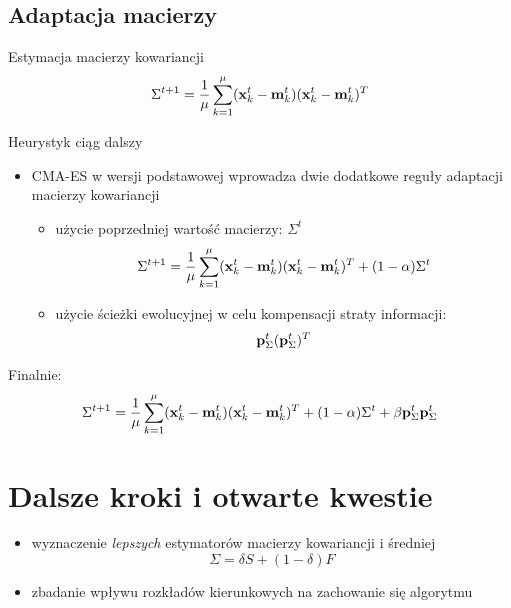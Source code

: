 \documentclass[slidescentered]{beamer}
\newcommand{\wek}[1]{
	{\bf #1} 
}
\begin{document}
\subsection{Adaptacja macierzy}

\begin{frame}{Estymacja macierzy kowariancji}
	\begin{equation}
		\Sigma^{t+1} = \frac{1}{\mu}\sum^{\mu}_{k = 1}(\wek{x}^{t}_{k} - \wek{m}^{t}_{k})(\wek{x}^{t}_{k} - \wek{m}^{t}_{k})^{T}
	\end{equation}
\end{frame}

\begin{frame}{Heurystyk ciąg dalszy}
	\begin{itemize}
	 	\item CMA-ES w wersji podstawowej wprowadza dwie dodatkowe reguły adaptacji macierzy kowariancji
			\begin{itemize}
	\pause 			\item użycie poprzedniej wartość macierzy: $\Sigma^{t}$
					\begin{equation}
						\Sigma^{t+1} = \frac{1}{\mu}\sum^{\mu}_{k = 1}(\wek{x}^{t}_{k} - \wek{m}^{t}_{k})(\wek{x}^{t}_{k} - \wek{m}^{t}_{k})^{T} + (1 - \alpha)\Sigma^{t}
					\end{equation}
		\pause 		\item użycie ścieżki ewolucyjnej w celu kompensacji straty informacji:
					\begin{equation}
						\wek{p}^{t}_{\Sigma}(\wek{p}^{t}_{\Sigma})^{T}
					\end{equation}
			\end{itemize}
	\end{itemize}
Finalnie:
	\pause \begin{equation}
		\Sigma^{t+1} = \frac{1}{\mu}\sum^{\mu}_{k = 1}(\wek{x}^{t}_{k} - \wek{m}^{t}_{k})(\wek{x}^{t}_{k} - \wek{m}^{t}_{k})^{T} + (1 - \alpha)\Sigma^{t} + \beta\wek{p}^{t}_{\Sigma}\wek{p}^{t}_{\Sigma}
	\end{equation}
\end{frame}

\section{Dalsze kroki i otwarte kwestie}

\begin{frame}
	\begin{itemize}
	 	\item wyznaczenie \textit{lepszych} estymatorów macierzy kowariancji i średniej
			\begin{equation}
				\Sigma = \delta S + (1-\delta)F
			\end{equation}
		\pause \item zbadanie wpływu rozkładów kierunkowych na zachowanie się algorytmu
	\end{itemize}
\end{frame}
\end{document}
